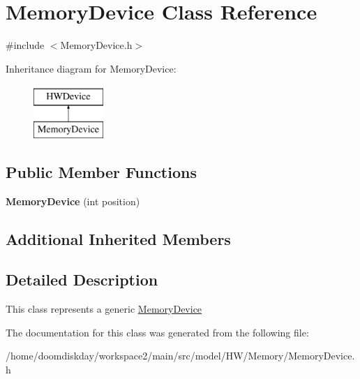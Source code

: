\hypertarget{classMemoryDevice}{}\section{Memory\+Device Class Reference}
\label{classMemoryDevice}


{\ttfamily \#include $<$Memory\+Device.\+h$>$}

Inheritance diagram for Memory\+Device\+:\begin{figure}[H]
\begin{center}
\leavevmode
\includegraphics[height=2.000000cm]{classMemoryDevice}
\end{center}
\end{figure}
\subsection*{Public Member Functions}
\begin{DoxyCompactItemize}
\item 
{\bfseries Memory\+Device} (int position)\hypertarget{classMemoryDevice_a8f890a8d70b54abefa45ac1d6f7a28be}{}\label{classMemoryDevice_a8f890a8d70b54abefa45ac1d6f7a28be}

\end{DoxyCompactItemize}
\subsection*{Additional Inherited Members}


\subsection{Detailed Description}
This class represents a generic \hyperlink{classMemoryDevice}{Memory\+Device} 

The documentation for this class was generated from the following file\+:\begin{DoxyCompactItemize}
\item 
/home/doomdiskday/workspace2/main/src/model/\+H\+W/\+Memory/Memory\+Device.\+h\end{DoxyCompactItemize}
